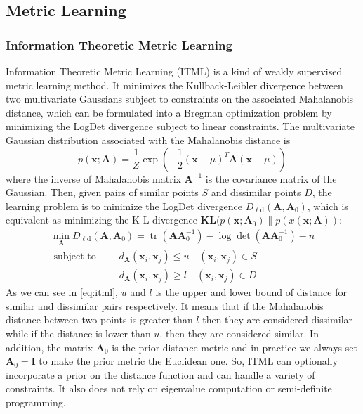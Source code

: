 \documentclass[conference]{IEEEtran}
\begin{document}
\subsection{Metric Learning}
\subsubsection{Information Theoretic Metric Learning}
\par
Information Theoretic Metric Learning (ITML) \cite{Davis2007Information} is a kind of weakly supervised metric learning method. It minimizes the Kullback-Leibler divergence between two multivariate Gaussians subject to constraints on the associated Mahalanobis distance, which can be formulated into a Bregman optimization problem by minimizing the LogDet divergence subject to linear constraints.
The multivariate Gaussian distribution associated with the Mahalanobis distance is
\begin{equation}
	p(\mathbf{x;A})=\dfrac{1}{Z}\exp(-\dfrac{1}{2}(\mathbf{x}-\mu)^T\mathbf{A}(\mathbf{x}-\mu))
\end{equation}
where the inverse of Mahalanobis matrix $\mathbf{A}^{-1}$ is the covariance matrix of the Gaussian.
Then, given pairs of similar points $S$ and dissimilar points $D$, the learning problem is to minimize the LogDet divergence $D_{\ell \mathrm{d}}\left(\mathbf{A}, \mathbf{A}_{0}\right)$, which is equivalent as minimizing the K-L divergence $\mathbf{KL}(p(\mathbf{x};\mathbf{A}_0)\|p(x(\mathbf{x};\mathbf{A}))$:
\begin{equation}
	\label{eq:itml}
	\begin{array}{c}
		\min _{\mathbf{A}} D_{\ell \mathrm{d}}\left(\mathbf{A}, \mathbf{A}_{0}\right)=\operatorname{tr}\left(\mathbf{A} \mathbf{A}_{0}^{-1}\right)-\log \operatorname{det}\left(\mathbf{A} \mathbf{A}_{0}^{-1}\right)-n \\
		\text { subject to } \qquad d_{\mathbf{A}}\left(\mathbf{x}_{i}, \mathbf{x}_{j}\right) \leq u \quad\left(\mathbf{x}_{i}, \mathbf{x}_{j}\right) \in S \\
		\qquad\qquad\qquad\quad d_{\mathbf{A}}\left(\mathbf{x}_{i}, \mathbf{x}_{j}\right) \geq l \quad\left(\mathbf{x}_{i}, \mathbf{x}_{j}\right) \in D
	\end{array}
\end{equation}
As we can see in \ref{eq:itml}, $u$ and $l$ is the upper and lower bound of distance for similar and dissimilar pairs respectively. It means that if the Mahalanobis distance between two points is greater than $l$ then they are considered dissimilar while if the distance is lower than $u$, then they are considered similar.
In addition, the matrix $\mathbf{A}_0$ is the prior distance metric and in practice we always set $\mathbf{A}_0=\mathbf{I}$ to make the prior metric the Euclidean one. So, ITML can optionally incorporate a prior on the distance function and can handle a variety of constraints. It also does not rely on eigenvalue computation or semi-definite programming.
\end{document}
